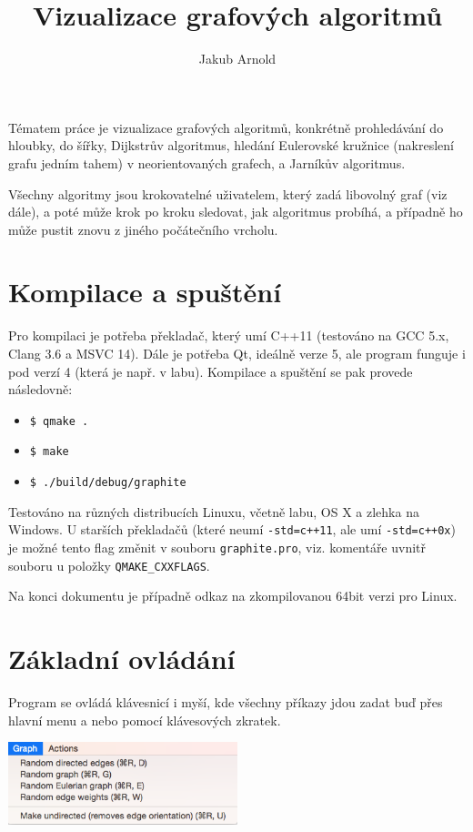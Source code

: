 \documentclass{article}
\title{Vizualizace grafových algoritmů}
\author{Jakub Arnold}
\date{}
\def\code#1{\texttt{#1}}
\begin{document}
\maketitle

Tématem práce je vizualizace grafových algoritmů, konkrétně prohledávání
do hloubky, do šířky, Dijkstrův algoritmus, hledání Eulerovské kružnice (nakreslení grafu jedním tahem)
v neorientovaných grafech, a Jarníkův algoritmus.

Všechny algoritmy jsou krokovatelné uživatelem, který zadá libovolný
graf (viz dále), a poté může krok po kroku sledovat, jak algoritmus
probíhá, a případně ho může pustit znovu z jiného počátečního vrcholu.

\section{Kompilace a spuštění}

Pro kompilaci je potřeba překladač, který umí C++11 (testováno na GCC 5.x, Clang 3.6 a MSVC 14).
Dále je potřeba Qt, ideálně verze 5, ale program funguje i pod verzí 4 (která je např. v labu).
Kompilace a spuštění se pak provede následovně:

\begin{itemize}
  \item \code{\$ qmake .}
  \item \code{\$ make}
  \item \code{\$ ./build/debug/graphite}
\end{itemize}

Testováno na různých distribucích Linuxu, včetně labu, OS X a zlehka na Windows. U starších překladačů
(které neumí \code{-std=c++11}, ale umí \code{-std=c++0x}) je možné tento flag změnit v souboru \code{graphite.pro}, viz. komentáře uvnitř souboru u položky \code{QMAKE\_CXXFLAGS}.

Na konci dokumentu je případně odkaz na zkompilovanou 64bit verzi pro Linux.

\pagebreak

\section{Základní ovládání}

Program se ovládá klávesnicí i myší, kde všechny příkazy jdou zadat buď
přes hlavní menu a nebo pomocí klávesových zkratek.

\begin{center}
    \includegraphics[width=0.5\textwidth]{KJaB5S6.png}
\end{center}
\end{document}
